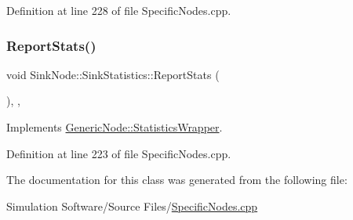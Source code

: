 Definition at line 228 of file Specific\+Nodes.\+cpp.

\mbox{\label{class_sink_node_1_1_sink_statistics_a2b8337521bc63a06000571aaede60ad9}} 
\subsubsection{\texorpdfstring{Report\+Stats()}{ReportStats()}}
{\footnotesize\ttfamily void Sink\+Node\+::\+Sink\+Statistics\+::\+Report\+Stats (\begin{DoxyParamCaption}{ }\end{DoxyParamCaption})\hspace{0.3cm}{\ttfamily [inline]}, {\ttfamily [override]}, {\ttfamily [virtual]}}



Implements \hyperlink{class_generic_node_1_1_statistics_wrapper_a280ae59c2d5f64be5848335dc1b77c21}{Generic\+Node\+::\+Statistics\+Wrapper}.



Definition at line 223 of file Specific\+Nodes.\+cpp.



The documentation for this class was generated from the following file\+:\begin{DoxyCompactItemize}
\item 
Simulation Software/\+Source Files/\hyperlink{_specific_nodes_8cpp}{Specific\+Nodes.\+cpp}\end{DoxyCompactItemize}
